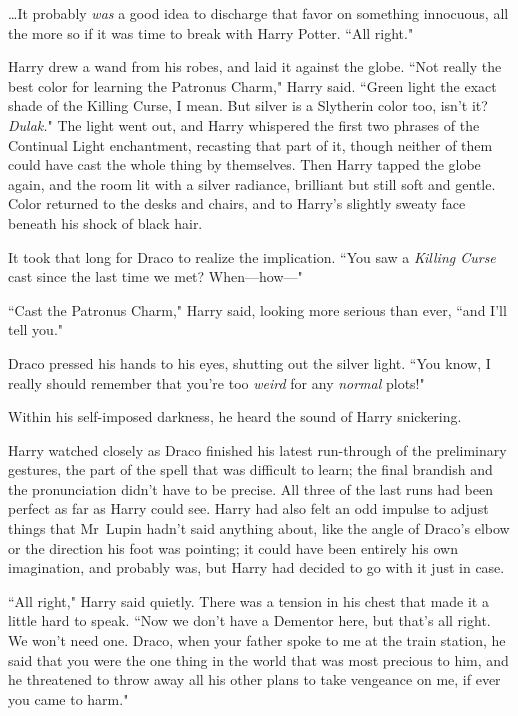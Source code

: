 {\ldots}It probably \emph{was} a good idea to discharge that favor on something innocuous, all the more so if it was time to break with Harry Potter. ``All right."

Harry drew a wand from his robes, and laid it against the globe. ``Not really the best color for learning the Patronus Charm," Harry said. ``Green light the exact shade of the Killing Curse, I mean. But silver is a Slytherin color too, isn't it? \emph{Dulak.}" The light went out, and Harry whispered the first two phrases of the Continual Light enchantment, recasting that part of it, though neither of them could have cast the whole thing by themselves. Then Harry tapped the globe again, and the room lit with a silver radiance, brilliant but still soft and gentle. Color returned to the desks and chairs, and to Harry's slightly sweaty face beneath his shock of black hair.

It took that long for Draco to realize the implication. ``You saw a \emph{Killing Curse} cast since the last time we met? When—how—"

``Cast the Patronus Charm," Harry said, looking more serious than ever, ``and I'll tell you."

Draco pressed his hands to his eyes, shutting out the silver light. ``You know, I really should remember that you're too \emph{weird} for any \emph{normal} plots!"

Within his self-imposed darkness, he heard the sound of Harry snickering.

\later

Harry watched closely as Draco finished his latest run-through of the preliminary gestures, the part of the spell that was difficult to learn; the final brandish and the pronunciation didn't have to be precise. All three of the last runs had been perfect as far as Harry could see. Harry had also felt an odd impulse to adjust things that Mr~Lupin hadn't said anything about, like the angle of Draco's elbow or the direction his foot was pointing; it could have been entirely his own imagination, and probably was, but Harry had decided to go with it just in case.

``All right," Harry said quietly. There was a tension in his chest that made it a little hard to speak. ``Now we don't have a Dementor here, but that's all right. We won't need one. Draco, when your father spoke to me at the train station, he said that you were the one thing in the world that was most precious to him, and he threatened to throw away all his other plans to take vengeance on me, if ever you came to harm."

